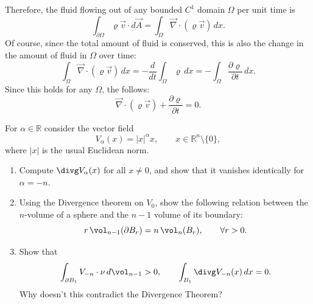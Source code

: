 Therefore, the fluid flowing out of any bounded $C^1$ domain $\Omega$ per unit time is
\[\int_{\partial\Omega} \varrho\vec v\cdot d\vec A = \int_\Omega \vec\nabla\cdot(\varrho
  \vec v)\,dx.\]
Of course, since the total amount of fluid is conserved, this is also the change in the
amount of fluid in $\Omega$ over time:
\[\int_\Omega \vec\nabla\cdot(\varrho\vec v)\,dx = -\frac{d}{dt}\int_\Omega \varrho\,dx
  = -\int_\Omega \frac{\partial\varrho}{\partial t}\,dx.\]
Since this holds for any $\Omega$, the 
 follows:
\[\vec\nabla\cdot(\varrho\vec v) + \frac{\partial\varrho}{\partial t} = 0.\]




\begin{exercise}
\label{ex:radial_vector_fields_flux}
For $\alpha\in\mathbb{R}$ consider the vector field
\[V_\alpha(x) = \lvert x\rvert^\alpha x, \qquad x\in\mathbb{R}^n\setminus\{0\},\]
where $\lvert x\rvert$ is the usual Euclidean norm.
\begin{enumerate}[label=\textbf{(\alph*)}]
  \item Compute $\divg V_\alpha(x)$ for all $x\neq0$, and show that it vanishes identically
  for $\alpha=-n$.
  \item Using the Divergence theorem on $V_0$, show the following relation between the
  $n$-volume of a sphere and the $n-1$ volume of its boundary:
  \[r\,\vol_{n-1}(\partial B_r) = n\,\vol_n(B_r), \qquad \forall r>0.\]
  \item Show that
  \[\int_{\partial B_1} V_{-n}\cdot\nu\,d\vol_{n-1} > 0, \qquad \int_{B_1} \divg V_{-n}(x)\,dx
    = 0.\]
  Why doesn't this contradict the Divergence Theorem?
\end{enumerate}
\end{exercise}


